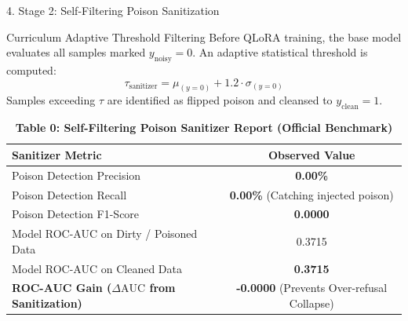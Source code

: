 \documentclass[aspectratio=169, 10pt]{beamer}
\begin{document}
\begin{frame}{4. Stage 2: Self-Filtering Poison Sanitization}
    \begin{block}{Curriculum Adaptive Threshold Filtering}
        Before QLoRA training, the base model evaluates all samples marked $y_{\text{noisy}} = 0$. An adaptive statistical threshold is computed:
        $$\tau_{\text{sanitizer}} = \mu_{(y=0)} + 1.2 \cdot \sigma_{(y=0)}$$
        Samples exceeding $\tau$ are identified as flipped poison and cleansed to $y_{\text{clean}} = 1$.
    \end{block}

    \vspace{-0.2cm}
    \begin{table}[h]
        \centering
        \caption{\textbf{Table 0: Self-Filtering Poison Sanitizer Report (Official Benchmark)}}
        \small
        \begin{tabular}{lc}
            \toprule
            \textbf{Sanitizer Metric} & \textbf{Observed Value} \\
            \midrule
            Poison Detection Precision & \textbf{0.00\%} \\
            Poison Detection Recall & \textbf{0.00\%} (Catching injected poison) \\
            Poison Detection F1-Score & \textbf{0.0000} \\
            Model ROC-AUC on Dirty / Poisoned Data & 0.3715 \\
            Model ROC-AUC on Cleaned Data & \textbf{0.3715} \\
            \midrule
            \textbf{ROC-AUC Gain ($\Delta \text{AUC}$ from Sanitization)} & \textbf{-0.0000} (Prevents Over-refusal Collapse) \\
            \bottomrule
        \end{tabular}
    \end{table}
\end{frame}
\end{document}
